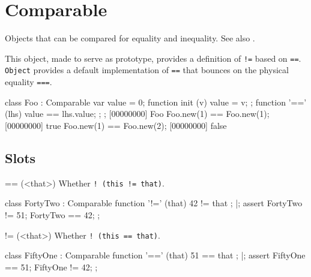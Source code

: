 
\section{Comparable}
Objects that can be compared for equality and inequality.  See also
.

This object, made to serve as prototype, provides a definition of
\lstinline{!=} based on \lstinline{==}.  \lstinline{Object} provides
a default implementation of \lstinline{==} that bounces on the physical
equality \lstinline{===}.

\begin{urbiscript}[firstnumber=1]
class Foo : Comparable
{
  var value = 0;
  function init (v) { value = v; };
  function '==' (lhs) { value == lhs.value; };
};
[00000000] Foo
Foo.new(1) == Foo.new(1);
[00000000] true
Foo.new(1) == Foo.new(2);
[00000000] false
\end{urbiscript}

\subsection{Slots}

\begin{urbiscriptapi}
\item[==](<that>)
  Whether \lstinline|! (this != that)|.
\begin{urbiscript}
class FortyTwo : Comparable
{
  function '!=' (that) { 42 != that };
}|;
assert
{
  FortyTwo != 51;
  FortyTwo == 42;
};
\end{urbiscript}


\item[!=](<that>)
  Whether \lstinline|! (this == that)|.

\begin{urbiscript}
class FiftyOne : Comparable
{
  function '==' (that) { 51 == that };
}|;
assert
{
  FiftyOne == 51;
  FiftyOne != 42;
};
\end{urbiscript}
\end{urbiscriptapi}

